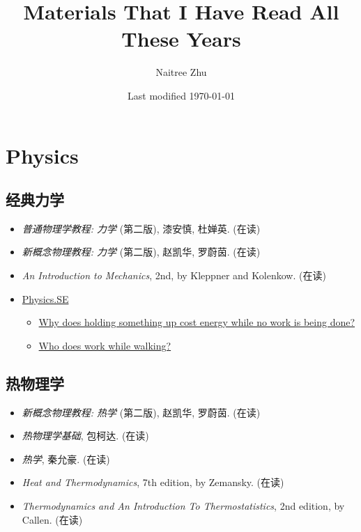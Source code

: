 \documentclass{article}
\title{Materials That I Have Read All These Years}
\author{Naitree Zhu}
\date{Last modified \today}
\newcommand{\book}[1]{\textit{#1}}
\begin{document}
\maketitle

\section{Physics}
\subsection{经典力学}
\begin{itemize}
    \item \book{普通物理学教程: 力学} (第二版), 漆安慎, 杜婵英. (在读)
    \item \book{新概念物理教程: 力学} (第二版), 赵凯华, 罗蔚茵. (在读)
    \item \book{An Introduction to Mechanics}, 2nd, by Kleppner and Kolenkow. (在读)
    \item \href{http://physics.stackexchange.com/}{Physics.SE}
        \begin{itemize}
            \item \href{http://physics.stackexchange.com/questions/1984/why-does-holding-something-up-cost-energy-while-no-work-is-being-done}{Why does holding something up cost energy while no work is being done?}
            \item \href{http://physics.stackexchange.com/questions/132978/who-does-work-while-walking}{Who does work while walking?}
        \end{itemize}
\end{itemize}

\subsection{热物理学}
\begin{itemize}
    \item \book{新概念物理教程: 热学} (第二版), 赵凯华, 罗蔚茵. (在读)
    \item \book{热物理学基础}, 包柯达. (在读)
    \item \book{热学}, 秦允豪. (在读)
    \item \book{Heat and Thermodynamics}, 7th edition, by Zemansky. (在读)
    \item \book{Thermodynamics and An Introduction To Thermostatistics}, 2nd edition, by Callen. (在读)
\end{itemize}
\end{document}
